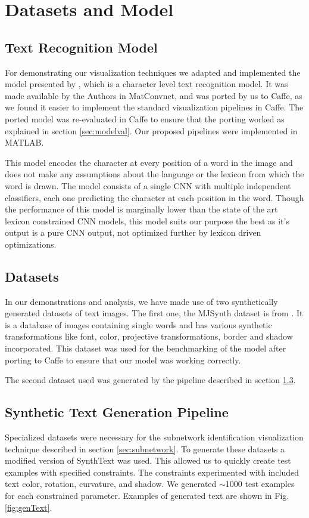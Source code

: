 \documentclass[10pt,twocolumn,letterpaper]{article}
\begin{document}
\section{Datasets and Model}


\subsection{Text Recognition Model}
For demonstrating our visualization techniques we adapted and implemented the model presented by \cite{Jaderberg14c}, which is a character level text recognition model. It was made available by the Authors in MatConvnet, and was ported by us to Caffe, as we found it easier to implement the standard visualization pipelines in Caffe. The ported model was re-evaluated in Caffe to ensure that the porting worked as explained in section \ref{sec:modelval}. Our proposed pipelines were implemented in MATLAB.


This model encodes the character at every position of a word in the image and does not make any assumptions about the language or the lexicon from which the word is drawn. The model consists of a single CNN with multiple independent classifiers, each one predicting the character at each position in the word. Though the performance of this model is marginally lower than the state of the art lexicon constrained CNN models, this model suits our purpose the best as it's output is a pure CNN output, not optimized further by lexicon driven optimizations. 


\subsection{Datasets}
In our demonstrations and analysis, we have made use of two synthetically generated datasets of text images. The first one, the MJSynth dataset is from \cite{Jaderberg14c}. It is a database of images containing single words and has various synthetic transformations like font, color, projective transformations, border and shadow incorporated. This dataset was used for the benchmarking of the model after porting to Caffe to ensure that our model was working correctly.


The second dataset used was generated by the pipeline described in section \ref{sec:synthtext}.

\subsection{Synthetic Text Generation Pipeline} \label{sec:synthtext}
Specialized datasets were necessary for the subnetwork identification visualization technique described in section \ref{sec:subnetwork}.
To generate these datasets a modified version of SynthText \cite{Gupta16} was used. This allowed us to quickly create test examples with specified constraints. The constraints experimented with included text color, rotation, curvature, and shadow. We generated  $\sim$1000 test examples for each constrained parameter. Examples of generated text are shown in Fig. \ref{fig:genText}.
\end{document}
